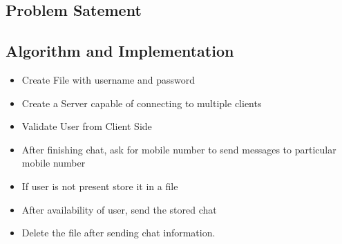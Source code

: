 \documentclass[12pt]{article}
\begin{document}
  \subsection{Problem Satement}
  
  \subsection{Algorithm and Implementation}
  \begin{itemize}
  \item Create File with username and password
  \item Create a Server capable of connecting to multiple clients
  \item Validate User from Client Side
  \item After finishing chat, ask for mobile number to send messages to particular mobile number
  \item If user is not present store it in a file
  \item After availability of user, send the stored chat
  \item Delete the file after sending chat information.

  \end{itemize}
  
\end{document}
